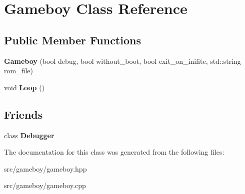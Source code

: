\hypertarget{classGameboy}{}\section{Gameboy Class Reference}
\label{classGameboy}
\subsection*{Public Member Functions}
\begin{DoxyCompactItemize}
\item 
\mbox{\label{classGameboy_a2d4e84cda18ef3429a3dff15c7610265}} 
{\bfseries Gameboy} (bool debug, bool without\+\_\+boot, bool exit\+\_\+on\+\_\+inifite, std\+::string rom\+\_\+file)
\item 
\mbox{\label{classGameboy_ae61353b933089cf137da173a60fc59af}} 
void {\bfseries Loop} ()
\end{DoxyCompactItemize}
\subsection*{Friends}
\begin{DoxyCompactItemize}
\item 
\mbox{\label{classGameboy_af637948d2b98b924152a6f3bf5acdb6e}} 
class {\bfseries Debugger}
\end{DoxyCompactItemize}


The documentation for this class was generated from the following files\+:\begin{DoxyCompactItemize}
\item 
src/gameboy/gameboy.\+hpp\item 
src/gameboy/gameboy.\+cpp\end{DoxyCompactItemize}
